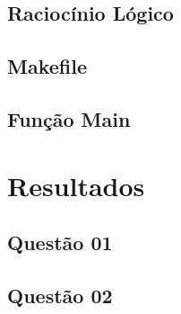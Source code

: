 \documentclass[11pt]{article}
\begin{document}
	\subsection{Racioc\'inio L\'ogico}
	\subsection{Makefile}
	\subsection{Fun\c{c}\~ao Main}
\section{Resultados}
	\subsection{Quest\~ao 01}
	\subsection{Quest\~ao 02}
\end{document}
